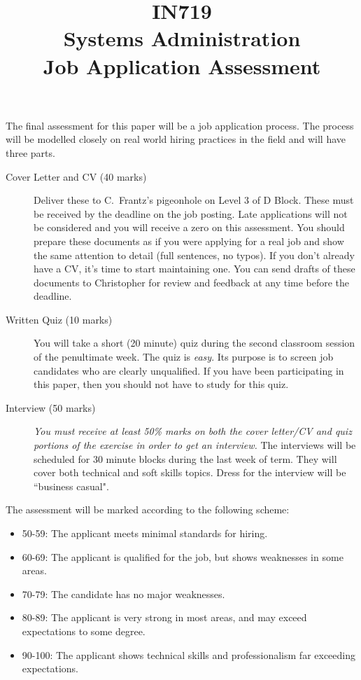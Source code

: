 \documentclass{article}   	%
\title{IN719\\Systems Administration\\Job Application Assessment}
\date{}
\begin{document}
\maketitle
The final assessment for this paper will be a job application process.  The process will be modelled closely on real world hiring practices in the field and will have three parts.


\begin{description}
\item[Cover Letter and CV (40 marks)] Deliver these to C.~Frantz's pigeonhole on Level 3 of D Block.  These must be received by the deadline on the job posting.  Late applications will not be considered and you will receive a zero on this assessment.  You should prepare these documents as if you were applying for a real job and show the same attention to detail (full sentences, no typos).  If you don't already have a CV, it's time to start maintaining one.  You can send drafts of these documents to Christopher for review and feedback at any time before the deadline.

\item[Written Quiz (10 marks)] You will take a short (20 minute) quiz during the second classroom session of the penultimate week.  The quiz is \emph{easy}.  Its purpose is to screen job candidates who are clearly unqualified.  If you have been participating in this paper, then you should not have to study for this quiz.

\item[Interview (50 marks)] \emph{You must receive at least 50\% marks on both the cover letter/CV and quiz portions of the exercise in order to get an interview.} The interviews will be scheduled for 30 minute blocks during the last week of term.  They will cover both technical and soft skills topics.  Dress for the interview will be ``business casual".  

\end{description}

The assessment will be marked according to the following scheme:
\begin{itemize}
\item 50-59:  The applicant meets minimal standards for hiring.  
\item 60-69:  The applicant is qualified for the job, but shows weaknesses in some areas.
\item 70-79:  The candidate has no major weaknesses. 
\item 80-89:  The applicant is very strong in most areas, and may exceed expectations to some degree. 
\item 90-100: The applicant shows technical skills and professionalism far exceeding expectations.  
\end{itemize}
\end{document}
